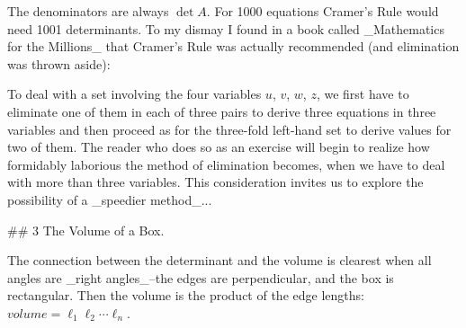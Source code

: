 The denominators are always \(\det A\). For 1000 equations Cramer's Rule would need 1001 determinants. To my dismay I found in a book called _Mathematics for the Millions_ that Cramer's Rule was actually recommended (and elimination was thrown aside):

To deal with a set involving the four variables \(u\), \(v\), \(w\), \(z\), we first have to eliminate one of them in each of three pairs to derive three equations in three variables and then proceed as for the three-fold left-hand set to derive values for two of them. The reader who does so as an exercise will begin to realize how formidably laborious the method of elimination becomes, when we have to deal with more than three variables. This consideration invites us to explore the possibility of a _speedier method_...

## 3 The Volume of a Box.

The connection between the determinant and the volume is clearest when all angles are _right angles_--the edges are perpendicular, and the box is rectangular. Then the volume is the product of the edge lengths: \(volume=\ell_{1}\ell_{2}\cdots\ell_{n}\).

